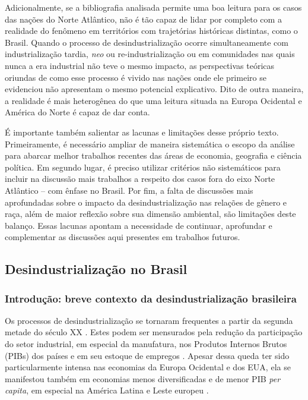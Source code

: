 Adicionalmente, se a bibliografia analisada permite uma boa leitura para
os casos das nações do Norte Atlântico, não é tão capaz de lidar por
completo com a realidade do fenômeno em territórios com trajetórias
históricas distintas, como o Brasil. Quando o processo de
desindustrialização ocorre simultaneamente com industrialização tardia,
\emph{neo} ou re-industrialização ou em comunidades nas quais nunca a
era industrial não teve o mesmo impacto, as perspectivas teóricas
oriundas de como esse processo é vivido nas nações onde ele primeiro se
evidenciou não apresentam o mesmo potencial explicativo. Dito de outra
maneira, a realidade é mais heterogênea do que uma leitura situada na
Europa Ocidental e América do Norte é capaz de dar conta.

É importante também salientar as lacunas e limitações desse próprio
texto. Primeiramente, é necessário ampliar de maneira sistemática o
escopo da análise para abarcar melhor trabalhos recentes das áreas de
economia, geografia e ciência política. Em segundo lugar, é preciso
utilizar critérios não sistemáticos para incluir na discussão mais
trabalhos a respeito dos casos fora do eixo Norte Atlântico -- com
ênfase no Brasil. Por fim, a falta de discussões mais aprofundadas sobre
o impacto da desindustrialização nas relações de gênero e raça, além de
maior reflexão sobre sua dimensão ambiental, são limitações deste
balanço. Essas lacunas apontam a necessidade de continuar, aprofundar e
complementar as discussões aqui presentes em trabalhos futuros.

\subsection{Desindustrialização no Brasil}\label{desindustrializauxe7uxe3o-no-brasil}

\subsubsection{Introdução: breve contexto da desindustrialização brasileira}

Os processos de desindustrialização se tornaram frequentes a partir da
segunda metade do século XX \citep{emery_geographies_2019,high_wounds_2013,lawson_making_2020,strangleman_introduction_2013}. Estes podem ser mensurados pela
redução da participação do setor industrial, em especial da manufatura,
nos Produtos Internos Brutos (PIBs) dos países e em seu estoque de
empregos \citep{tregenna_characterising_2009}. Apesar dessa queda ter sido particularmente
intensa nas economias da Europa Ocidental e dos EUA, ela se manifestou
também em economias menos diversificadas e de menor PIB \emph{per
capita}, em especial na América Latina e Leste europeu \citep{rodrik_premature_2016}.

